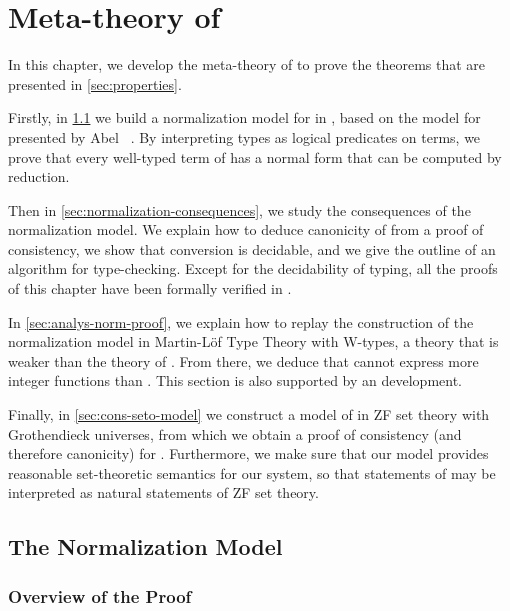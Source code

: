 \setchapterpreamble[u]{\margintoc}
\chapter{Meta-theory of \SetoidCC}

In this chapter, we develop the meta-theory of \SetoidCC to prove
the theorems that are presented in \cref{sec:properties}.

Firstly, in \cref{sec:logic-relat-with} we build a normalization model for \SetoidCC
in \Agda, based on the model for \MLTT presented by Abel 
\etal~\cite{Abel:POPL2018}. 
% 
By interpreting types as logical predicates on terms, we prove that 
every well-typed term of \SetoidCC has a normal form that can be computed
by reduction.

Then in \cref{sec:normalization-consequences}, we study the consequences of 
the normalization model. We explain how to deduce canonicity of \SetoidCC from
a proof of consistency, we show that conversion is decidable, and we give the 
outline of an algorithm for type-checking. 
% 
Except for the decidability of typing, all the proofs of this chapter have been
formally verified in \Agda. 

In \cref{sec:analys-norm-proof}, we explain how to replay the construction of
the normalization model in Martin-Löf Type Theory with W-types, a theory that is
weaker than the theory of \Agda. 
% 
From there, we deduce that \SetoidCC cannot express more integer functions than \MLTT. 
% 
This section is also supported by an \Agda development.

Finally, in \cref{sec:cons-seto-model} we construct a model of \SetoidCC in ZF 
set theory with Grothendieck universes, from which we obtain a proof of 
consistency (and therefore canonicity) for \SetoidCC. Furthermore, we make sure
that our model provides reasonable set-theoretic semantics for our system, so
that statements of \SetoidCC may be interpreted as natural statements of ZF set 
theory.

\section{The Normalization Model}
\label{sec:logic-relat-with}

\subsection{Overview of the Proof}

